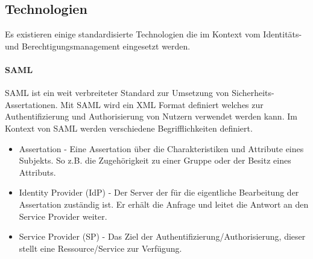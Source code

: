 \documentclass[11pt]{article}
\begin{document}
\subsection{Technologien}
Es existieren einige standardisierte Technologien die im Kontext vom Identitäts- und Berechtigungsmanagement eingesetzt werden.
\paragraph{SAML}
SAML ist ein weit verbreiteter Standard zur Umsetzung von Sicherheits-Assertationen. Mit SAML wird ein XML Format definiert welches zur Authentifizierung und Authorisierung von Nutzern verwendet werden kann. Im Kontext von SAML werden verschiedene Begrifflichkeiten definiert.~\cite{hughes2005security}
\begin{itemize}
  \item Assertation - Eine Assertation über die Charakteristiken und Attribute eines Subjekts. So z.B. die Zugehörigkeit zu einer Gruppe oder der Besitz eines Attributs.
  \item Identity Provider (IdP) - Der Server der für die eigentliche Bearbeitung der Assertation zuständig ist. Er erhält die Anfrage und leitet die Antwort an den Service Provider weiter.
  \item Service Provider (SP) - Das Ziel der Authentifizierung/Authorisierung, dieser stellt eine Ressource/Service zur Verfügung.
\end{itemize}
\end{document}
